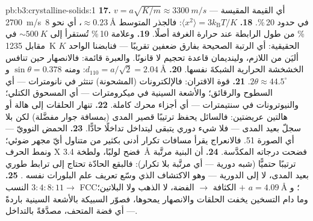 \begin{solution}{pb:b3:crystalline-solids:1}
\textbf{17.} $v = a\sqrt{K/m} \approx \qty{3300}{m/s}$ ---
أي القيمة المقيسة \qty{2700}{m/s} في حدود 20\,\%.
\textbf{18.} $\langle x^2\rangle = 3k_{\text{B}}T/K$: فالجذر المتوسط
$\approx\qty{0.23}{\angstrom}$، أي نحو 8\,\% من طول الرابطة
عند حرارة الغرفة أصلًا.
\textbf{19.} وعلامة 10\,\% تُستقرأ إلى $\sim\qty{500}{K}$
في مقابل \qty{1235}{K} الحقيقية: أي الرتبة الصحيحة بفارق ضعفين تقريبًا
--- فنابضنا الواحد $K$ أليَن من اللازم، ولينديمان قاعدة تحجيم
لا قانونًا. والعبرة قائمة: فالانصهار حين تنافس الخشخشة
الحرارية الشبكةَ نفسها.
\textbf{20.} $d_{110} = a/\sqrt2 = \qty{2.04}{\angstrom}$:
ومنه $\sin\theta = 0.378$ و $2\theta \approx 44.5^\circ$.
\textbf{21.} قوة الاقتران: فالإلكترونات (المشحونة) تنتثر في
نانومترات --- أي السطوح والرقائق؛ والأشعة السينية في ميكرومترات ---
أي المسحوق الكتلي؛ والنيوترونات في سنتيمترات --- أي أجزاء محرك كاملة.
\textbf{22.} تنهار الحلقات إلى هالة أو هالتين عريضتين:
فالسائل يحفظ ترتيبًا قصير المدى (بمسافة جوار مفضَّلة)
لكن بلا سجلّ بعيد المدى --- فلا شيء دوري يتبقى
ليتداخل تداخلًا حادًّا.
\textbf{23.} الحمض النوويّ --- أي الصورة 51. فالانعراج يقرأ مسافات
تكرار أدنى بكثير من متناول أيّ مجهر ضوئي؛ ونمط الحرف X
فضح لولبًا، ولطخة \qty{3.4}{\angstrom} فضحت درجاته المكدَّسة.
\textbf{24.} أن البنية مرتَّبة ترتيبًا حتميًّا
(شبه دورية --- أي مرتَّبة بلا تكرار): فالبقع الحادّة تحتاج إلى
ترابط طوري بعيد المدى، لا إلى الدورية --- وهو الاكتشاف
الذي وسّع تعريف علم البلورات نفسه .
\textbf{25.} النسب $3:4:8:11 \to$ FCC؛ و $a = \qty{4.09}{\angstrom}$
$+$ الكثافة $\to$ الفضة، لا الذهب ولا البلاتين؛ وما دام التسخين
يخفت الحلقات والانصهار يمحوها، فصوّر السبيكة بالأشعة السينية باردةً ---
أي فضة المتحف، مصدَّقةً بالتداخل.
\end{solution}
